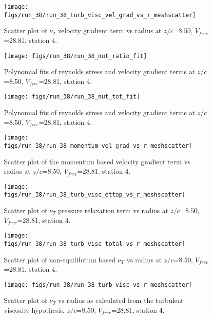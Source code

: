 \begin{figure}[H]
\centering
\texttt{[image: figs/run\_38/run\_38\_turb\_visc\_vel\_grad\_vs\_r\_meshscatter]}
\caption{Scatter plot of $\nu_T$ velocity gradient term vs radius at $z/c$=8.50, $V_{free}$=28.81, station 4.}
\end{figure}


\begin{figure}[H]
\centering
\texttt{[image: figs/run\_38/run\_38\_nut\_ratio\_fit]}
\caption{Polynomial fits of reynolds stress and velocity gradient terms at $z/c$=8.50, $V_{free}$=28.81, station 4.}
\end{figure}


\begin{figure}[H]
\centering
\texttt{[image: figs/run\_38/run\_38\_nut\_tot\_fit]}
\caption{Polynomial fits of reynolds stress and velocity gradient terms at $z/c$=8.50, $V_{free}$=28.81, station 4.}
\end{figure}


\begin{figure}[H]
\centering
\texttt{[image: figs/run\_38/run\_38\_momentum\_vel\_grad\_vs\_r\_meshscatter]}
\caption{Scatter plot of the momentum based velocity gradient term vs radius at $z/c$=8.50, $V_{free}$=28.81, station 4.}
\end{figure}


\begin{figure}[H]
\centering
\texttt{[image: figs/run\_38/run\_38\_turb\_visc\_ettap\_vs\_r\_meshscatter]}
\caption{Scatter plot of $\nu_T$ pressure relaxation term vs radius at $z/c$=8.50, $V_{free}$=28.81, station 4.}
\end{figure}


\begin{figure}[H]
\centering
\texttt{[image: figs/run\_38/run\_38\_turb\_visc\_total\_vs\_r\_meshscatter]}
\caption{Scatter plot of non-equilibrium based $\nu_T$ vs radius at $z/c$=8.50, $V_{free}$=28.81, station 4.}
\end{figure}


\begin{figure}[H]
\centering
\texttt{[image: figs/run\_38/run\_38\_turb\_visc\_vs\_r\_meshscatter]}
\caption{Scatter plot of $\nu_T$ vs radius as calculated from the turbulent viscosity hypothesis. $z/c$=8.50, $V_{free}$=28.81, station 4.}
\end{figure}


